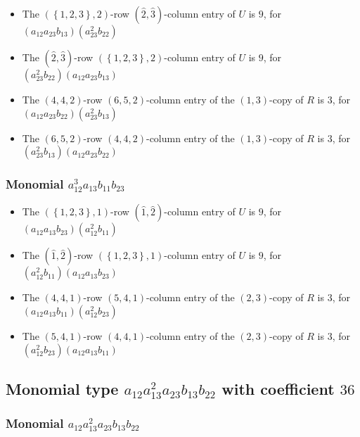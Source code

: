 \documentclass{article}
\begin{document}
\begin{itemize}
\item The $ \left(\left\{1, 2, 3\right\}, 2\right) $-row $ (\hat{2}, \hat{3}) $-column entry of $U$ is $ 9 $, for $( a_{12} a_{23} b_{13} )( a_{23}^{2} b_{22} )$ 
\item The $(\hat{2}, \hat{3})$-row $ \left(\left\{1, 2, 3\right\}, 2\right) $-column entry of $U$ is $ 9 $, for $( a_{23}^{2} b_{22} )( a_{12} a_{23} b_{13} )$ 
\item The $(4, 4, 2)$-row $(6, 5, 2)$-column entry of the $ \left(1, 3\right) $-copy of $R$ is $ 3 $, for $( a_{12} a_{23} b_{22} )( a_{23}^{2} b_{13} )$ 
\item The $(6, 5, 2)$-row $(4, 4, 2)$-column entry of the $ \left(1, 3\right) $-copy of $R$ is $ 3 $, for $( a_{23}^{2} b_{13} )( a_{12} a_{23} b_{22} )$ 
\end{itemize}
\subsubsection{Monomial $ a_{12}^{3} a_{13} b_{11} b_{23} $}

\begin{itemize}
\item The $ \left(\left\{1, 2, 3\right\}, 1\right) $-row $ (\hat{1}, \hat{2}) $-column entry of $U$ is $ 9 $, for $( a_{12} a_{13} b_{23} )( a_{12}^{2} b_{11} )$ 
\item The $(\hat{1}, \hat{2})$-row $ \left(\left\{1, 2, 3\right\}, 1\right) $-column entry of $U$ is $ 9 $, for $( a_{12}^{2} b_{11} )( a_{12} a_{13} b_{23} )$ 
\item The $(4, 4, 1)$-row $(5, 4, 1)$-column entry of the $ \left(2, 3\right) $-copy of $R$ is $ 3 $, for $( a_{12} a_{13} b_{11} )( a_{12}^{2} b_{23} )$ 
\item The $(5, 4, 1)$-row $(4, 4, 1)$-column entry of the $ \left(2, 3\right) $-copy of $R$ is $ 3 $, for $( a_{12}^{2} b_{23} )( a_{12} a_{13} b_{11} )$ 
\end{itemize}
\subsection{Monomial type $ a_{12} a_{13}^{2} a_{23} b_{13} b_{22} $ with coefficient $ 36 $}

\subsubsection{Monomial $ a_{12} a_{13}^{2} a_{23} b_{13} b_{22} $}
\end{document}
